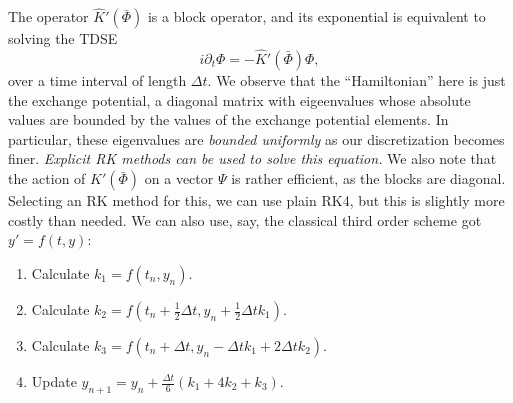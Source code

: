 \documentclass[12pt]{article}
\begin{document}
The operator $\hat{K}'(\bar{\Phi})$ is a block operator, and its exponential is equivalent to solving the TDSE
\begin{equation}
    i \partial_t \Phi = -\hat{K}'(\bar{\Phi}) \Phi,
\end{equation}
over a time interval of length $\Delta t$. We observe that the ``Hamiltonian'' here is just the exchange potential, a diagonal matrix with eigeenvalues whose absolute values are bounded by the values of the exchange potential elements. In particular, these eigenvalues are \emph{bounded uniformly} as our discretization becomes finer. \emph{Explicit RK methods can be used to solve this equation.} We also note that the action of $\hat{K}'(\bar{\Phi})$ on a vector $\Psi$ is rather efficient, as the blocks are diagonal. Selecting an RK method for this, we can use plain RK4, but this is slightly more costly than needed. We can also use, say, the classical third order scheme got $y' = f(t,y)$:
\begin{enumerate}
\item Calculate \(k_1 = f(t_n, y_n)\).
\item Calculate \(k_2 = f\left(t_n + \frac{1}{2}\Delta t, y_n + \frac{1}{2}\Delta t k_1\right)\).
\item Calculate \(k_3 = f(t_n + \Delta t, y_n - \Delta t k_1 + 2\Delta t k_2)\).
\item Update \(y_{n+1} = y_n + \frac{\Delta t}{6}(k_1 + 4k_2 + k_3)\).
\end{enumerate}
\end{document}
